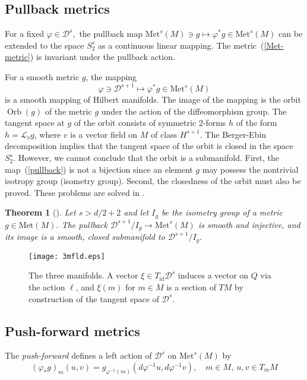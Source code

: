 \documentclass[a5paper,10pt,twoside]{article}
\newcommand{\cL}{\ensuremath{\mathcal{L}}}
\newcommand{\cD}{\ensuremath{\mathcal{D}}}
\newcommand{\Met}{\ensuremath{\mathrm{Met}}}
\DeclareMathOperator*{\Orb}{Orb}
\DeclareMathOperator*{\id}{id}
\theoremstyle{plain}
\newtheorem{teo}{Theorem}[section]
\theoremstyle{definition}
\theoremstyle{remark}
\begin{document}
\subsection{Pullback metrics}
For a fixed $\varphi\in \cD^s,$ the pullback map $\Met^s(M)\ni g\mapsto\varphi^*g\in\Met^s(M)$ can be extended to the space $S_2^s$ as a continuous linear mapping. The metric~(\ref{Met-metric}) is invariant under the pullback action.

For a smooth metric $g$, the mapping
%
\begin{equation}
\label{pullback}
\varphi\ni\cD^{s+1}\mapsto \varphi^*g\in\Met^s(M)
\end{equation}
%
is a smooth mapping of Hilbert manifolds. The image of the mapping is the orbit $\Orb(g)$ of the metric $g$ under the action of the diffeomorphism group. The tangent space at $g$ of the orbit consists of symmetric 2-forms $h$ of the form $h=\cL_vg$, where $v$ is a vector field on $M$ of class $H^{s+1}$. The Berger-Ebin decomposition implies that the tangent space of the orbit is closed in the space $S_2^s$. However, we cannot conclude
that the orbit is a submanifold. First, the map~(\ref{pullback}) is not a bijection since an element $g$ may possess the nontrivial isotropy group (isometry group). Second, the closedness of the orbit must also be proved. These problems are solved in \cite{ebin1967space}.

\begin{teo}[\cite{ebin1967space}]
	Let $s>d/2+2$ and let $I_g$ be the isometry group of a metric $g\in\Met(M)$. The pullback $\cD^{s+1}/I_g\to\Met^s(M)$ is smooth and injective, and its image is a smooth, closed submanifold to $\cD^{s+1}/I_g.$
\end{teo}

\begin{figure}
	\centering
	\texttt{[image: 3mfld.eps]}
	\caption{\label{fig:3mfld} The three manifolds. A vector $\xi\in T_{\id}\cD^s$ induces a vector on $Q$ via the action $\ell$, and $\xi(m)$ for $m\in M$ is a section of $TM$ by  construction of the tangent space of $\cD^s$. }
\end{figure}

\subsection{Push-forward metrics}
The \textit{push-forward} defines a left action of $\cD^s$ on $\Met^s(M)$ by
$$
(\varphi_*g)_m(u,v)=g_{\varphi^{-1}(m)}\left(d\varphi^{-1}u,d\varphi^{-1}v\right),\quad m\in M,\ u,v\in T_{m}M
$$
\end{document}
